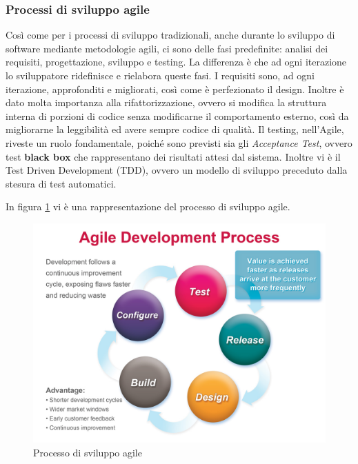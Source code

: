 \subsubsection{Processi di sviluppo agile}
Così come per i processi di sviluppo tradizionali, anche durante lo sviluppo di software mediante metodologie agili, ci sono delle fasi predefinite: analisi dei requisiti, progettazione, sviluppo e testing. La differenza è che ad ogni iterazione lo sviluppatore ridefinisce e rielabora queste fasi.
I requisiti sono, ad ogni iterazione, approfonditi e migliorati, così come è perfezionato il design. Inoltre è dato molta importanza alla rifattorizzazione, ovvero si modifica la struttura interna di porzioni di codice senza modificarne il comportamento esterno, così da migliorarne la leggibilità ed avere sempre codice di qualità.
Il testing, nell'Agile, riveste un ruolo fondamentale, poiché sono previsti sia gli \textit{Acceptance Test}, ovvero test \textbf{black box} che rappresentano dei risultati attesi dal sistema.
Inoltre vi è il Test Driven Development (TDD), ovvero un modello di sviluppo preceduto dalla stesura di test automatici.

In figura \ref{agiledevelopment} vi è una rappresentazione del processo di sviluppo agile.

\begin{figure}[h!]
\begin{center}
\includegraphics[scale=0.27]{imgs/agiledevelopment.jpg}
\caption{Processo di sviluppo agile\label{agiledevelopment}} 
\end{center}
\end{figure}

